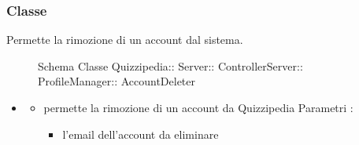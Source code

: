 \subsubsection{Classe }
Permette la rimozione di un account dal sistema.
\begin{figure}[H]
\centering
\noindent{}
\caption[Schema Classe AccountDeleter]{Schema Classe Quizzipedia:: Server:: ControllerServer:: ProfileManager:: AccountDeleter}
\end{figure}
\begin{itemize}
\item {}
\begin{itemize}
\item {}
\newline
permette la rimozione di un account da Quizzipedia
\newline
Parametri :
\begin{itemize}
\item {}
\newline
l'email dell'account da eliminare
\end{itemize}
\end{itemize}
\end{itemize}
